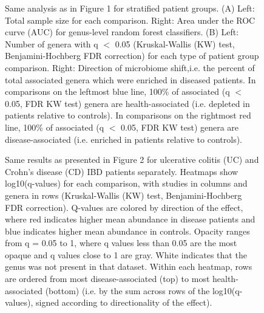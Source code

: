 \FloatBarrier

\begin{figure}[h]
	\begin{center}
	\caption{Same analysis as in Figure 1 for stratified patient groups. (A) Left: Total sample size for each comparison. Right: Area under the ROC curve (AUC) for genus-level random forest classifiers. (B) Left: Number of genera with q $<$ 0.05 (Kruskal-Wallis (KW) test, Benjamini-Hochberg FDR correction) for each type of patient group comparison. Right: Direction of microbiome shift,i.e. the percent of total associated genera which were enriched in diseased patients. In comparisons on the leftmost blue line, 100\% of associated (q $<$ 0.05, FDR KW test) genera are health-associated (i.e. depleted in patients relative to controls). In comparisons on the rightmost red line, 100\% of associated (q $<$ 0.05, FDR KW test) genera are disease-associated (i.e. enriched in patients relative to controls).
}
	\label{fig:split_cases_fig1}
	\end{center}
\end{figure}

\newpage
\begin{figure}[h]
	\begin{center}
	\caption{Same results as presented in Figure 2 for ulcerative colitis (UC) and Crohn's disease (CD) IBD patients separately. Heatmaps show log10(q-values) for each comparison, with studies in columns and genera in rows (Kruskal-Wallis (KW) test, Benjamini-Hochberg FDR correction). Q-values are colored by direction of the effect, where red indicates higher mean abundance in disease patients and blue indicates higher mean abundance in controls. Opacity ranges from q = 0.05 to 1, where q values less than 0.05 are the most opaque and q values close to 1 are gray. White indicates that the genus was not present in that dataset. Within each heatmap, rows are ordered from most disease-associated (top) to most health-associated (bottom) (i.e. by the sum across rows of the log10(q-values), signed according to directionality of the effect).
}
	\label{fig:split_cases_heatmaps}
	\end{center}
\end{figure}

